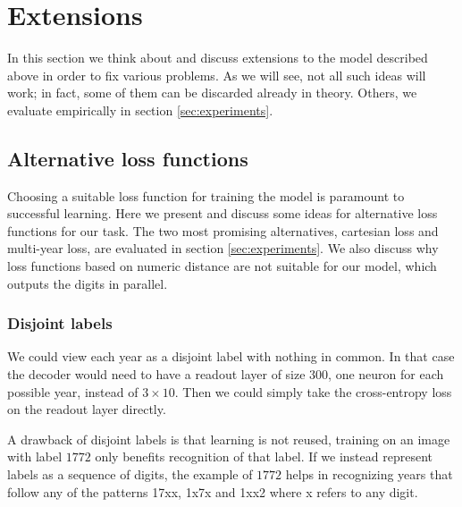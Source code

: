 \newpage
\section{Extensions}

In this section we think about and discuss extensions to the model described above in order to fix various problems.
As we will see, not all such ideas will work; in fact, some of them can be discarded already in theory. Others, we evaluate empirically in section \ref{sec:experiments}.


\subsection{Alternative loss functions} \label{ssec:alt_loss}

Choosing a suitable loss function for training the model is paramount to successful learning.
Here we present and discuss some ideas for alternative loss functions for our task.
The two most promising alternatives, cartesian loss and multi-year loss, are evaluated in section \ref{sec:experiments}. We also discuss why loss functions based on numeric distance are not suitable for our model, which outputs the digits in parallel.


\subsubsection{Disjoint labels}


We could view each year as a disjoint label with nothing in common. In that case the decoder would need to have a readout layer of size $300$, one neuron for each possible year, instead of $3 \times 10$. Then we could simply take the cross-entropy loss on the readout layer directly.

A drawback of disjoint labels is that learning is not reused, training on an image with label $1772$ only benefits recognition of that label.
If we instead represent labels as a sequence of digits, the example of $1772$ helps in recognizing years that follow any of the patterns 17xx, 1x7x and 1xx2 where x refers to any digit.

